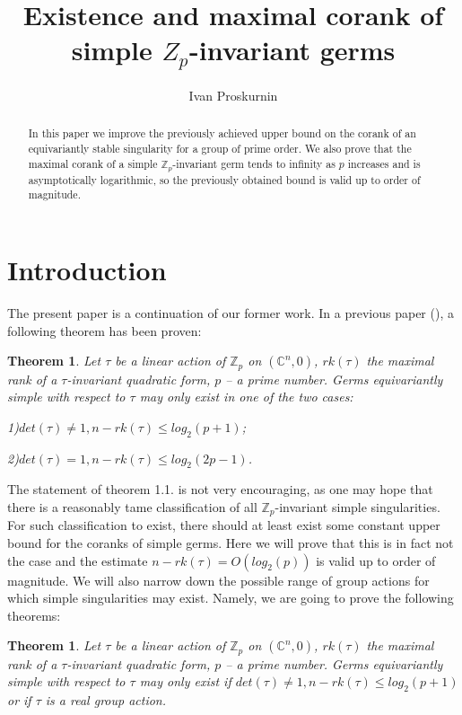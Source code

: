 \documentclass{amsart}
\title{Existence and maximal corank of simple $Z_p$-invariant germs}
\author{Ivan Proskurnin}
\date{}
\newtheorem{theorem}[subsection]{Theorem}
\begin{document}
\maketitle

\begin{abstract}
In this paper we improve the previously achieved upper bound on the corank of an equivariantly stable singularity for a group of prime order.
We also prove that the maximal corank of a simple $\mathbb{Z}_p$-invariant germ tends to infinity as $p$ increases and is asymptotically logarithmic, so the previously obtained bound is valid up to order of magnitude.
\end{abstract}

\section{Introduction}

The present paper is a continuation of our former work. In a previous paper (\cite{1}), a following theorem has been proven:
\medskip



\begin{theorem} Let  $\tau$ be a linear action of $\mathbb{Z}_p$ on $(\mathbb{C}^n,0)$, $rk(\tau)$ the maximal rank of  a $\tau$-invariant quadratic form, $p$ -- a prime number. Germs equivariantly simple with respect to $\tau$ may only exist in one of the two cases:

1)$det(\tau) \neq 1, n - rk(\tau) \leq log_2 (p+1)$;

2)$det(\tau) =1, n - rk(\tau) \leq log_2 (2p-1)$.

\end{theorem}

The statement of theorem 1.1. is not very encouraging, as one may hope that there is a reasonably tame classification of all $\mathbb{Z}_p$-invariant simple singularities. For such classification to exist, there should at least exist some constant upper bound for the coranks of simple germs. Here we will prove that this is in fact not the case and the estimate $n - rk(\tau) = O(log_2(p))$ is valid up to order of magnitude. We will also narrow down the possible range of group actions for which simple singularities may exist. Namely, we are going to prove the following theorems:

\begin{theorem} Let  $\tau$ be a linear action of $\mathbb{Z}_p$ on $(\mathbb{C}^n,0)$, $rk(\tau)$ the maximal rank of  a $\tau$-invariant quadratic form, $p$ -- a prime number. Germs equivariantly simple with respect to $\tau$ may only exist if $det(\tau) \neq 1, n - rk(\tau) \leq log_2 (p+1)$ or if $\tau$ is a real group action.


\end{theorem}
\end{document}
